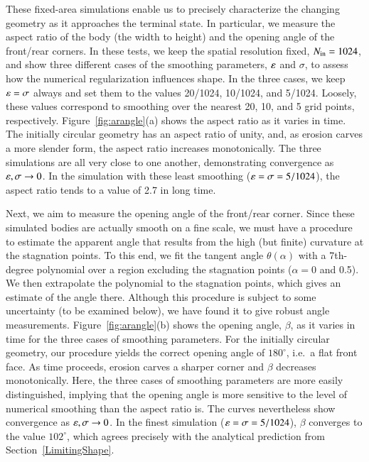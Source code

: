 \documentclass[preprint, 10pt]{elsarticle}
\begin{document}

These fixed-area simulations enable us to precisely characterize the changing geometry as it approaches the terminal state. In particular, we measure the aspect ratio of the body (the width to height) and the opening angle of the front/rear corners. In these tests, we keep the spatial resolution fixed, $N_{\mathrm{in}} = 1024$, and show three different cases of the smoothing parameters, $\varepsilon$ and $\sigma$, to assess how the numerical regularization influences shape. In the three cases, we keep $\varepsilon = \sigma$ always and set them to the values 20/1024, 10/1024, and 5/1024. Loosely, these values correspond to smoothing over the nearest 20, 10, and 5 grid points, respectively. Figure~\ref{fig:arangle}(a) shows the aspect ratio as it varies in time. The initially circular geometry has an aspect ratio of unity, and, as erosion carves a more slender form, the aspect ratio increases monotonically. The three simulations are all very close to one another, demonstrating convergence as $\varepsilon, \sigma \to 0$. In the simulation with these least smoothing ($\varepsilon = \sigma = 5/1024$), the aspect ratio tends to a value of 2.7 in long time.

Next, we aim to measure the opening angle of the front/rear corner. Since these simulated bodies are actually smooth on a fine scale, we must have a procedure to estimate the apparent angle that results from the high (but finite) curvature at the stagnation points. To this end, we fit the tangent angle $\theta(\alpha)$ with a 7th-degree polynomial over a region excluding the stagnation points ($\alpha = 0$ and 0.5). We then extrapolate the polynomial to the stagnation points, which gives an estimate of the angle there. Although this procedure is subject to some uncertainty (to be examined below), we have found it to give robust angle measurements.  Figure~\ref{fig:arangle}(b) shows the opening angle, $\beta$, as it varies in time for the three cases of smoothing parameters.  For the initially circular geometry, our procedure yields the correct opening angle of $180^{\circ}$, i.e.~a flat front face.  As time proceeds, erosion carves a sharper corner and $\beta$ decreases monotonically. Here, the three cases of smoothing parameters are more easily distinguished, implying that the opening angle is more sensitive to the level of numerical smoothing than the aspect ratio is. The curves nevertheless show convergence as $\varepsilon, \sigma \to 0$. In the finest simulation ($\varepsilon = \sigma = 5/1024$), $\beta$ converges to the value $102^{\circ}$, which agrees precisely with the analytical prediction from Section~\ref{LimitingShape}. 
\end{document}
